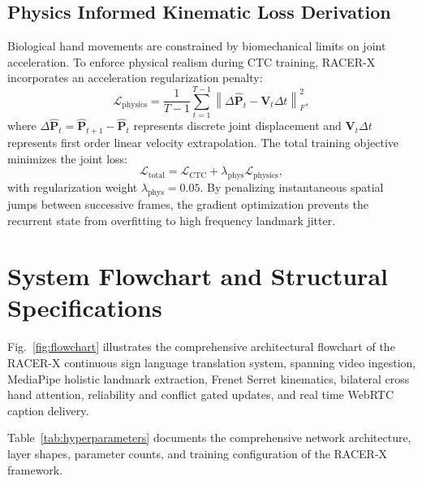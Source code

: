 \documentclass[10pt,conference]{IEEEtran}
\begin{document}
\subsection{Physics Informed Kinematic Loss Derivation}
Biological hand movements are constrained by biomechanical limits on joint acceleration. To enforce physical realism during CTC training, RACER-X incorporates an acceleration regularization penalty:
\begin{equation}
\mathcal{L}_{\text{physics}} = \frac{1}{T-1} \sum_{t=1}^{T-1} \left\| \Delta \hat{\mathbf{P}}_t - \mathbf{V}_t \Delta t \right\|_F^2,
\end{equation}
where $\Delta \hat{\mathbf{P}}_t = \hat{\mathbf{P}}_{t+1} - \hat{\mathbf{P}}_t$ represents discrete joint displacement and $\mathbf{V}_t \Delta t$ represents first order linear velocity extrapolation. The total training objective minimizes the joint loss:
\begin{equation}
\mathcal{L}_{\text{total}} = \mathcal{L}_{\text{CTC}} + \lambda_{\text{phys}} \mathcal{L}_{\text{physics}},
\end{equation}
with regularization weight $\lambda_{\text{phys}} = 0.05$. By penalizing instantaneous spatial jumps between successive frames, the gradient optimization prevents the recurrent state from overfitting to high frequency landmark jitter.

\section{System Flowchart and Structural Specifications}

Fig.~\ref{fig:flowchart} illustrates the comprehensive architectural flowchart of the RACER-X continuous sign language translation system, spanning video ingestion, MediaPipe holistic landmark extraction, Frenet Serret kinematics, bilateral cross hand attention, reliability and conflict gated updates, and real time WebRTC caption delivery.

Table~\ref{tab:hyperparameters} documents the comprehensive network architecture, layer shapes, parameter counts, and training configuration of the RACER-X framework.
\end{document}
